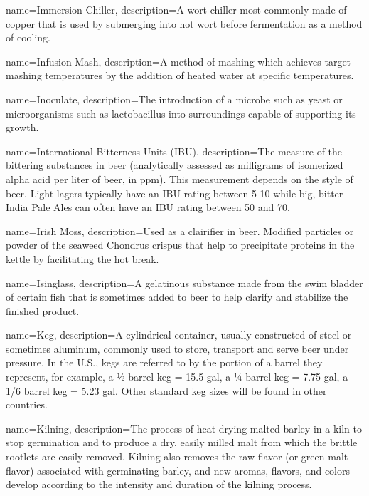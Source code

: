 {
  name={Immersion Chiller},
  description={A wort chiller most commonly made of copper that is used by submerging into hot wort before fermentation as a method of cooling.}
  }

{
  name={Infusion Mash},
  description={A method of mashing which achieves target mashing temperatures by the addition of heated water at specific temperatures.}
  }

{
  name={Inoculate},
  description={The introduction of a microbe such as yeast or microorganisms such as lactobacillus into surroundings capable of supporting its growth.}
  }

{
  name={International Bitterness Units (IBU)},
  description={The measure of the bittering substances in beer (analytically assessed as milligrams of isomerized alpha acid per liter of beer, in ppm). This measurement depends on the style of beer. Light lagers typically have an IBU rating between 5-10 while big, bitter India Pale Ales can often have an IBU rating between 50 and 70.}
  }

{
  name={Irish Moss},
  description={Used as a clairifier in beer. Modified particles or powder of the seaweed Chondrus crispus that help to precipitate proteins in the kettle by facilitating the hot break.}
  }

{
  name={Isinglass},
  description={A gelatinous substance made from the swim bladder of certain fish that is sometimes added to beer to help clarify and stabilize the finished product.}
  }

{
  name={Keg},
  description={A cylindrical container, usually constructed of steel or sometimes aluminum, commonly used to store, transport and serve beer under pressure. In the U.S., kegs are referred to by the portion of a barrel they represent, for example, a ½ barrel keg = 15.5 gal, a ¼ barrel keg = 7.75 gal, a 1/6 barrel keg = 5.23 gal. Other standard keg sizes will be found in other countries.}
  }

{
  name={Kilning},
  description={The process of heat-drying malted barley in a kiln to stop germination and to produce a dry, easily milled malt from which the brittle rootlets are easily removed. Kilning also removes the raw flavor (or green-malt flavor) associated with germinating barley, and new aromas, flavors, and colors develop according to the intensity and duration of the kilning process.}
  }

